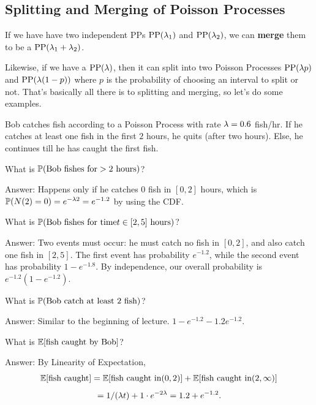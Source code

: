 \documentclass[11 pt]{scrartcl}
\begin{document}
\subsection{Splitting and Merging of Poisson Processes}
If we have have two independent PPs $\text{PP}(\lambda_1)$ and $\text{PP}(\lambda_2)$, we can \textbf{merge} them to be a $\text{PP}(\lambda_1 + \lambda_2)$. 

Likewise, if we have a $\text{PP}(\lambda)$, then it can split into two Poisson Processes $\text{PP}(\lambda p)$ and $\text{PP}(\lambda(1-p))$ where $p$ is the probability of choosing an interval to split or not. That's basically all there is to splitting and merging, so let's do some examples. 

\begin{example}[Fishing]
    Bob catches fish according to a Poisson Process with rate $\lambda = 0.6$ fish/hr. If he catches at least one fish in the first $2$ hours, he quits (after two hours). Else, he continues till he has caught the first fish. 
\end{example}
    
\begin{question}
    What is $\mathbb P(\text{Bob fishes for}>\text{2 hours})$? 
\end{question}

    Answer: Happens only if he catches 0 fish in $[0,2]$ hours, which is $\mathbb P(N(2) = 0) = e^{-\lambda 2} = e^{-1.2}$ by using the CDF. 

\begin{question}
    What is $\mathbb P(\text{Bob fishes for time} t\in[2,5]\text{ hours})$? 
\end{question}

    Answer: Two events must occur: he must catch no fish in $[0,2]$, and also catch one fish in $[2,5]$. The first event has probability $e^{-1.2}$, while the second event has probability $1-e^{-1.8}$. By independence, our overall probability is $e^{-1.2}(1-e^{-1.2})$. 

\begin{question}
    What is $\mathbb P(\text{Bob catch at least 2 fish})$? 
\end{question}

    Answer: Similar to the beginning of lecture. $1-e^{-1.2}-1.2e^{-1.2}$.  

\begin{question}
    What is $\mathbb E[\text{fish caught by Bob}]$? 
\end{question}
    
    Answer: By Linearity of Expectation, 
    \[ \mathbb E[\text{fish caught}] = \mathbb E[\text{fish caught in} (0,2)] + \mathbb E[\text{fish caught in} (2, \infty)] \] \[= 1/(\lambda t) + 1\cdot e^{-2\lambda} = 1.2 + e^{-1.2}.\] 
\end{document}
